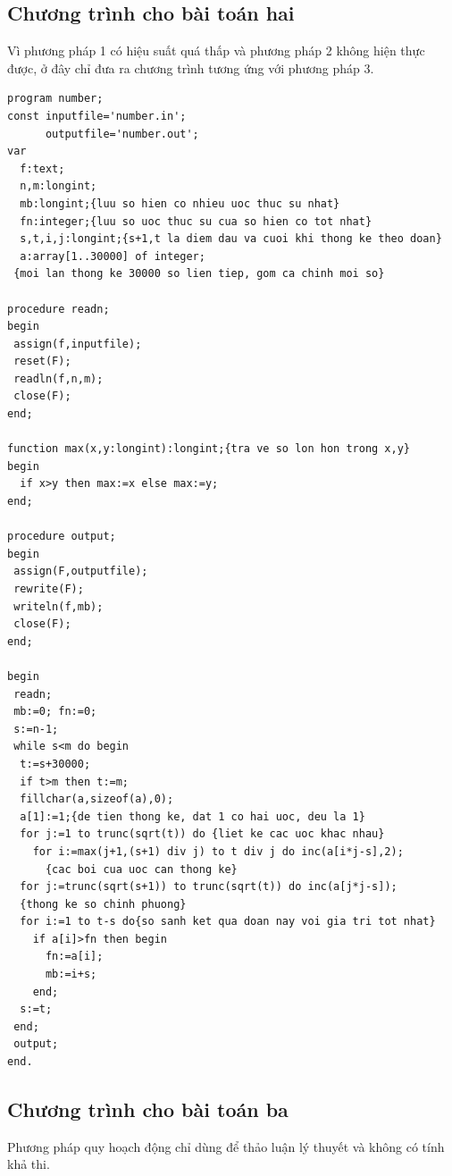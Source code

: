 \documentclass[11pt]{article}
\begin{document}
\subsection{Chương trình cho bài toán hai}

Vì phương pháp 1 có hiệu suất quá thấp và phương pháp 2 không hiện thực được,
ở đây chỉ đưa ra chương trình tương ứng với phương pháp 3.

\begin{verbatim}
program number;
const inputfile='number.in';
      outputfile='number.out';
var
  f:text;
  n,m:longint;
  mb:longint;{luu so hien co nhieu uoc thuc su nhat}
  fn:integer;{luu so uoc thuc su cua so hien co tot nhat}
  s,t,i,j:longint;{s+1,t la diem dau va cuoi khi thong ke theo doan}
  a:array[1..30000] of integer;
 {moi lan thong ke 30000 so lien tiep, gom ca chinh moi so}

procedure readn;
begin
 assign(f,inputfile);
 reset(F);
 readln(f,n,m);
 close(F);
end;

function max(x,y:longint):longint;{tra ve so lon hon trong x,y}
begin
  if x>y then max:=x else max:=y;
end;

procedure output;
begin
 assign(F,outputfile);
 rewrite(F);
 writeln(f,mb);
 close(F);
end;

begin
 readn;
 mb:=0; fn:=0;
 s:=n-1;
 while s<m do begin
  t:=s+30000;
  if t>m then t:=m;
  fillchar(a,sizeof(a),0);
  a[1]:=1;{de tien thong ke, dat 1 co hai uoc, deu la 1}
  for j:=1 to trunc(sqrt(t)) do {liet ke cac uoc khac nhau}
    for i:=max(j+1,(s+1) div j) to t div j do inc(a[i*j-s],2);
      {cac boi cua uoc can thong ke}
  for j:=trunc(sqrt(s+1)) to trunc(sqrt(t)) do inc(a[j*j-s]);
  {thong ke so chinh phuong}
  for i:=1 to t-s do{so sanh ket qua doan nay voi gia tri tot nhat}
    if a[i]>fn then begin
      fn:=a[i];
      mb:=i+s;
    end;
  s:=t;
 end;
 output;
end.
\end{verbatim}

\subsection{Chương trình cho bài toán ba}

Phương pháp quy hoạch động chỉ dùng để thảo luận lý thuyết và không có tính
khả thi.
\end{document}
